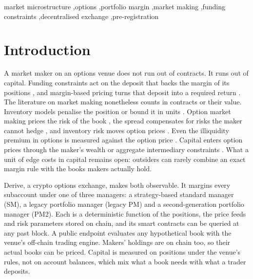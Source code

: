 \documentclass[a4paper,fleqn]{cas-dc}
\begin{document}
\begin{keywords}
market microstructure \sep options \sep portfolio margin \sep market making \sep funding constraints
\sep decentralised exchange \sep pre-registration
\end{keywords}

\maketitle
\makeatletter\gdef{}\gdef{}\makeatother
{}

\section{Introduction}\label{sec:intro}
A market maker on an options venue does not run out of contracts. It runs out of capital. Funding constraints
act on the deposit that backs the margin of its positions \citep{brunnermeier2009}, and margin-based pricing
turns that deposit into a required return \citep{garleanu2011}. The literature on market making nonetheless
counts in contracts or their value. Inventory models penalise the position \citep{ho1981,avellaneda2008} or
bound it in units \citep{gueant2013}. Option market making prices the risk of the book
\citep{stoikov2009,garleanu2009}, the spread compensates for risks the maker cannot hedge
\citep{jameson1992}, and inventory risk moves option prices \citep{muravyev2016}. Even the illiquidity premium
in options is measured against the option price \citep{christoffersen2018}. Capital enters option prices
through the maker's wealth \citep{fournier2020} or aggregate intermediary constraints \citep{chen2019}. What a
unit of edge costs in capital remains open: outsiders can rarely combine an exact margin rule with the books
makers actually hold.

Derive, a crypto options exchange, makes both observable. It margins every subaccount under one of three
managers: a strategy-based standard manager (SM), a legacy portfolio manager (legacy PM) and a
second-generation portfolio manager (PM2). Each is a deterministic function of the positions, the price feeds
and risk parameters stored on chain, and its smart contracts can be queried at any past block. A public endpoint
evaluates any hypothetical book with the venue's off-chain trading engine. Makers' holdings are on chain too,
so their actual books can be priced. Capital is measured on positions under the venue's rules, not on account
balances, which mix what a book needs with what a trader deposits.
\end{document}
